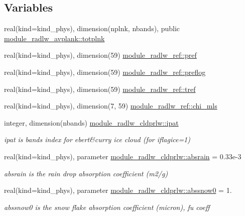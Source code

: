 \subsection*{Variables}
\begin{DoxyCompactItemize}
\item 
real(kind=kind\+\_\+phys), dimension(nplnk, nbands), public \hyperlink{namespacemodule__radlw__avplank_a40c3d6831ec6d7dbdb31254226c8f861}{module\+\_\+radlw\+\_\+avplank\+::totplnk}
\item 
real(kind=kind\+\_\+phys), dimension(59) \hyperlink{namespacemodule__radlw__ref_adda97d9a274bef59507633a3fc5a0e78}{module\+\_\+radlw\+\_\+ref\+::pref}
\item 
real(kind=kind\+\_\+phys), dimension(59) \hyperlink{group__module__radlw__main_ga4206f7320b6f1b59eb0132326263d2e4}{module\+\_\+radlw\+\_\+ref\+::preflog}
\item 
real(kind=kind\+\_\+phys), dimension(59) \hyperlink{group__module__radlw__main_ga56972f3948052e8b7f4717c192fc551d}{module\+\_\+radlw\+\_\+ref\+::tref}
\item 
real(kind=kind\+\_\+phys), dimension(7, 59) \hyperlink{group__module__radlw__main_gadc2bbd1ac0178afda84e74ad45404d31}{module\+\_\+radlw\+\_\+ref\+::chi\+\_\+mls}
\item 
integer, dimension(nbands) \hyperlink{namespacemodule__radlw__cldprlw_a9e8ebd81d5d62c2be4c006a595493aed}{module\+\_\+radlw\+\_\+cldprlw\+::ipat}
\begin{DoxyCompactList}\small\item\em ipat is bands index for ebert\&curry ice cloud (for iflagice=1) \end{DoxyCompactList}\item 
real(kind=kind\+\_\+phys), parameter \hyperlink{group__module__radlw__main_ga04bff194fec27e0586ab1b4770319882}{module\+\_\+radlw\+\_\+cldprlw\+::absrain} = 0.\+33e-\/3
\begin{DoxyCompactList}\small\item\em absrain is the rain drop absorption coefficient (m2/g) \end{DoxyCompactList}\item 
real(kind=kind\+\_\+phys), parameter \hyperlink{group__module__radlw__main_ga4bcd58c6a7e9abdfbb8f8ec7d925d143}{module\+\_\+radlw\+\_\+cldprlw\+::abssnow0} = 1.
\begin{DoxyCompactList}\small\item\em abssnow0 is the snow flake absorption coefficient (micron), fu coeff \end{DoxyCompactList}\item 

\end{DoxyCompactItemize}
